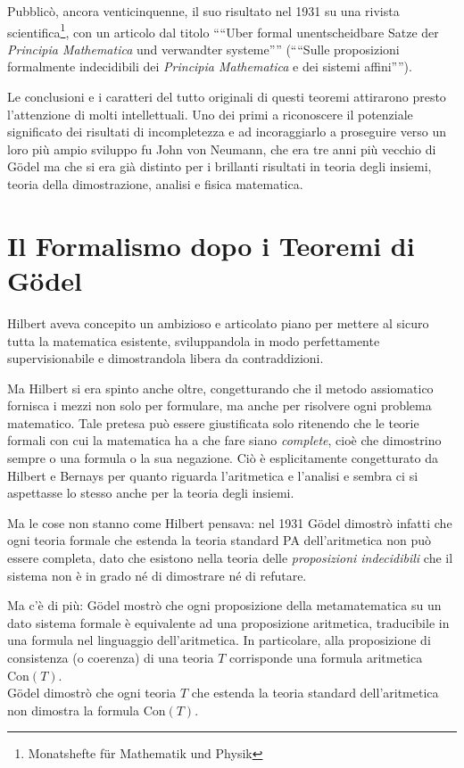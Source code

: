 Pubblicò, ancora venticinquenne, il suo risultato nel 1931 su una ri\-vi\-sta scien\-ti\-fi\-ca\footnote{Monatshefte f\"{u}r Mathematik und Physik}, con un articolo dal titolo "`"`Uber formal unentscheidbare Satze der \emph{Principia Mathematica} und verwandter systeme"'"' ("`"`Sulle proposizioni formalmente indecidibili dei \emph{Principia Mathematica} e dei sistemi affini"'"').

Le conclusioni e i caratteri del tutto originali di questi teoremi attirarono presto l'attenzione di molti intellettuali. Uno dei primi a riconoscere il potenziale significato dei risultati di incompletezza e ad incoraggiarlo a proseguire verso un loro più ampio sviluppo fu John von Neumann, che era tre anni più vecchio di G\"odel ma che si era già distinto per i brillanti risultati in teoria degli insiemi, teoria della dimostrazione, analisi e fisica matematica.
\bigskip



\section{Il Formalismo dopo i Teoremi di G\"odel}

Hilbert aveva concepito un ambizioso e articolato piano per mettere al sicuro tutta la matematica esistente, sviluppandola in modo perfettamente su\-per\-vi\-sio\-na\-bi\-le e dimostrandola libera da contraddizioni.

Ma Hilbert si era spinto anche oltre, congetturando che il metodo assiomatico fornisca i mezzi non solo per formulare, ma anche per risolvere ogni problema matematico. Tale pretesa può essere giustificata solo ritenendo che le teorie formali con cui la matematica ha a che fare siano \emph{complete}, cioè che dimostrino sempre o una formula o la sua negazione. Ciò è esplicitamente congetturato da Hilbert e Bernays per quanto riguarda l'aritmetica e l'analisi e sembra ci si aspettasse lo stesso anche per la teoria degli insiemi.

Ma le cose non stanno come Hilbert pensava: nel 1931 G\"odel dimostrò infatti che ogni teoria formale che estenda la teoria standard PA dell'aritmetica non può essere completa, dato che esistono nella teoria delle \emph{proposizioni indecidibili} che il sistema non è in grado né di dimostrare né di refutare.

Ma c'è di più: G\"odel mostrò che ogni proposizione della me\-ta\-ma\-te\-ma\-ti\-ca su un dato sistema formale è equivalente ad una proposizione aritmetica, traducibile in una formula nel linguaggio dell'aritmetica. In particolare, alla proposizione di consistenza (o coerenza) di una teoria $T$ cor\-ri\-spon\-de una formula aritmetica $\mathrm{Con}(T)$.\\ G\"odel dimostrò che ogni teoria $T$ che estenda la teoria standard dell'aritmetica non dimostra la formula $\mathrm{Con}(T)$.

